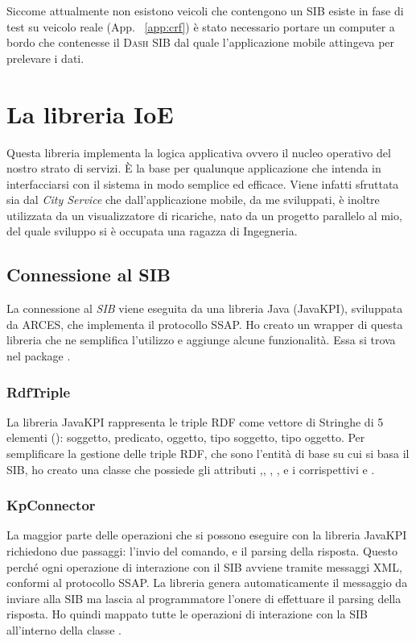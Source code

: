 Siccome attualmente non esistono veicoli che contengono un SIB esiste in fase di test su veicolo reale (App. ~\ref{app:crf}) è stato necessario portare un computer a bordo che contenesse il \textsc{Dash SIB} dal quale l'applicazione mobile attingeva per prelevare i dati.

\section{La libreria IoE}\label{subsec:ioe-lib}

Questa libreria implementa la logica applicativa ovvero il nucleo operativo del nostro strato di servizi. È la base per qualunque applicazione che intenda in interfacciarsi con il sistema in modo semplice ed efficace. Viene infatti sfruttata sia dal \emph{City Service} che dall'applicazione mobile, da me sviluppati, è inoltre utilizzata da un visualizzatore di ricariche, nato da un progetto parallelo al mio, del quale sviluppo si è occupata una ragazza di Ingegneria.

\subsection{Connessione al SIB}

La connessione al \emph{SIB} viene eseguita da una libreria Java (JavaKPI), sviluppata da ARCES, che implementa il protocollo SSAP. Ho creato un wrapper di questa libreria che ne semplifica l'utilizzo e aggiunge alcune funzionalità. Essa si trova nel package .

\subsubsection{RdfTriple}
La libreria JavaKPI rappresenta le triple RDF come vettore di Stringhe di 5 elementi (): soggetto, predicato, oggetto, tipo soggetto, tipo oggetto. 
Per semplificare la gestione delle triple RDF, che sono l'entità di base su cui si basa il SIB, ho creato una classe  che possiede gli attributi ,, , ,  e i corrispettivi  e .


\subsubsection{KpConnector}

La maggior parte delle operazioni che si possono eseguire con la libreria JavaKPI richiedono due passaggi: l'invio del comando, e il parsing della risposta. Questo perché ogni operazione di interazione con il SIB avviene tramite messaggi XML, conformi al protocollo SSAP. La libreria genera automaticamente il messaggio da inviare alla SIB ma lascia al programmatore l'onere di effettuare il parsing della risposta. Ho quindi mappato tutte le operazioni di interazione con la SIB all'interno della classe .

